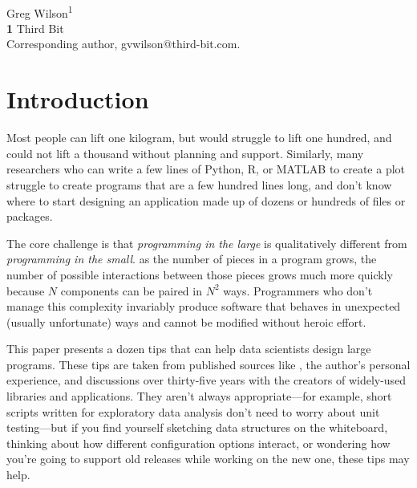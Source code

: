 \documentclass[10pt,letterpaper]{article}
\begin{document}
\vspace*{0.2in}

\begin{flushleft}
{\Large
\textbf{}
}
\newline
\\
{Greg Wilson}\textsuperscript{1{\ddag}}
\\
\bigskip
\textbf{1} Third Bit\\
{\ddag} Corresponding author, gvwilson@third-bit.com.
\end{flushleft}

\section*{Introduction}

Most people can lift one kilogram,
but would struggle to lift one hundred,
and could not lift a thousand without planning and support.
Similarly,
many researchers who can write a few lines of Python, R, or MATLAB to create a plot
struggle to create programs that are a few hundred lines long,
and don't know where to start designing an application made up of
dozens or hundreds of files or packages.

The core challenge is that
\emph{programming in the large} is qualitatively different from \emph{programming in the small}.
as the number of pieces in a program grows,
the number of possible interactions between those pieces grows much more quickly
because $N$ components can be paired in $N^2$ ways.
Programmers who don't manage this complexity
invariably produce software that behaves in unexpected (usually unfortunate) ways
and cannot be modified without heroic effort.

This paper presents a dozen tips that can help data scientists design large programs.
These tips are taken from published sources like \cite{Kernighan1999,Budgen2020},
the author's personal experience,
and discussions over thirty-five years with the creators of widely-used libraries and applications.
They aren't always appropriate---for example,
short scripts written for exploratory data analysis
don't need to worry about unit testing---but
if you find yourself sketching data structures on the whiteboard,
thinking about how different configuration options interact,
or wondering how you're going to support old releases while working on the new one,
these tips may help.
\end{document}
